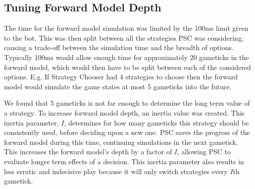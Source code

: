 \documentclass[]{article}
\begin{document}
\subsection{Tuning Forward Model Depth}
The time for the forward model simulation was limited by the 100ms limit given to the bot. This was then split between all the strategies PSC was considering, causing a trade-off between the simulation time and the breadth of options. Typically 100ms would allow enough time for approximately 20 gameticks in the forward model, which would then have to be split between each of the considered options. E.g. If Strategy Chooser had 4 strategies to choose then the forward model would simulate the game states at most 5 gameticks into the future.  

We found that 5 gameticks is not far enough to determine the long term value of a strategy. To increase forward model depth, an inertia value was created. This inertia parameter, $I$, determines for how many gameticks this strategy should be consistently used, before deciding upon a new one. PSC saves the progress of the forward model during this time, continuing simulations in the next gametick. This increases the forward model's depth by a factor of $I$, allowing PSC to evaluate longer term effects of a decision. This inertia parameter also results in less erratic and indecisive play because it will only switch strategies every $I$th gametick.
\end{document}
